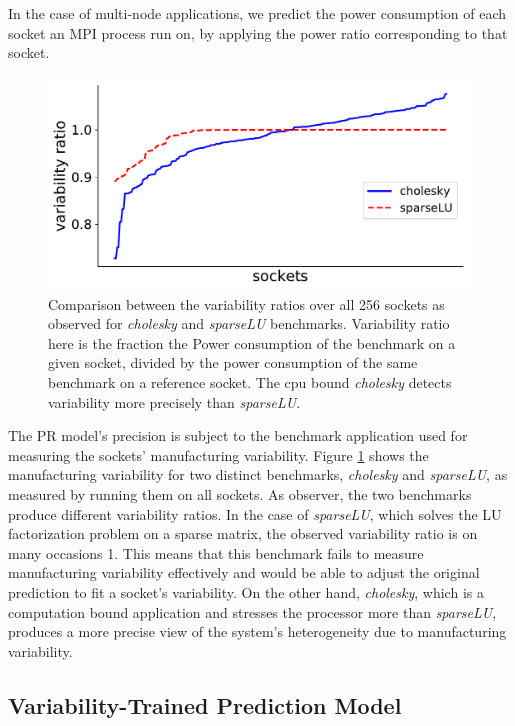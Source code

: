 In the case of multi-node applications, we predict the power consumption of each socket an
MPI process run on, by applying the power ratio corresponding to that socket.


\begin{figure}[ht!]
	\centering
  \includegraphics[width=.7\textwidth]{power_aware_job_scheduling/figures/benchmark_var_comparison}
	\caption{Comparison between the variability ratios over all 256 sockets as observed for
\textit{cholesky} and \textit{sparseLU} benchmarks.  Variability ratio here is the
fraction the Power consumption of the benchmark on a given socket, divided by the power
consumption of the same benchmark on a reference socket.  The cpu bound \textit{cholesky} detects variability more precisely than \textit{sparseLU}.}
	\label{fig:bench_var_comparison}
	\vspace{.5cm}
\end{figure}


The PR model's precision is subject to the benchmark application used for measuring the
sockets' manufacturing variability.  Figure \ref{fig:bench_var_comparison} shows the
manufacturing variability for two distinct benchmarks, \textit{cholesky} and
\textit{sparseLU}, as measured by running them on all sockets.  As observer, the two
benchmarks produce different variability ratios.  In the case of \textit{sparseLU}, which
solves the LU factorization problem on a sparse matrix, the observed variability ratio is
on many occasions 1.  This means that this benchmark fails to measure manufacturing
variability effectively and would be able to adjust the original prediction to fit a
socket's variability.  On the other hand, \textit{cholesky}, which is a computation bound
application and stresses the processor more than \textit{sparseLU}, produces a more
precise view of the system's heterogeneity due to manufacturing variability.


\subsection{Variability-Trained Prediction Model}
\label{sec:pmcs_model}

